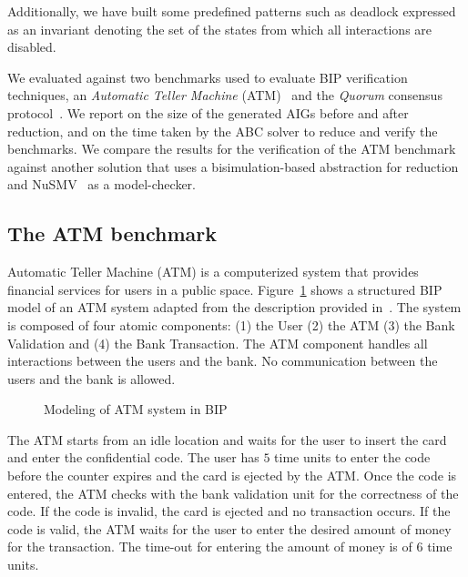 Additionally, we have built some predefined patterns such as deadlock expressed as an invariant denoting the set of the states from which all interactions are disabled. 



We evaluated \biptool{} against two benchmarks used to evaluate BIP verification techniques, 
an {\em Automatic Teller Machine} (ATM)~\cite{atm} and the {\em Quorum} consensus
protocol~\cite{guerraoui2012speculative}. We report on the size of the generated
AIGs before and after reduction, and on the time taken by the ABC solver to 
reduce and verify the benchmarks. We compare the results for the 
verification of the ATM benchmark against another solution that uses a bisimulation-based abstraction for reduction \cite{facs14} and NuSMV~\cite{nusmv} as a model-checker. 
%
\subsection{The ATM benchmark}
\label{subsec:atm}
%
Automatic Teller Machine (ATM) is a computerized system that provides financial services for users in 
a public space. Figure~\ref{fig:atm_bip} shows a structured BIP model of an ATM system adapted from the
description provided in~\cite{atm}.
The system is composed of four atomic components: (1) the User (2) the ATM (3) the Bank Validation 
and (4) the Bank Transaction.
The ATM component handles all interactions between the 
users and the bank. No communication between the users and the bank is allowed. 

\begin{figure}
 \centering
  \resizebox{1.0\textwidth}{!}{
       
  }
  \caption{Modeling of ATM system in BIP} 
  \label{fig:atm_bip}
\end{figure}

The ATM starts from an idle location and waits for the user to insert the card 
and enter the confidential code. The user has $5$ time units
to enter the code before the counter expires and the card is ejected by the ATM. 
Once the code is entered, the ATM checks with the bank validation unit for 
the correctness of the code. If the code is invalid, the card is ejected
and no transaction occurs. If the code is valid, the ATM waits for the user to enter
the desired amount of money for the transaction. The time-out for entering the amount 
of money is of $6$ time units. 

